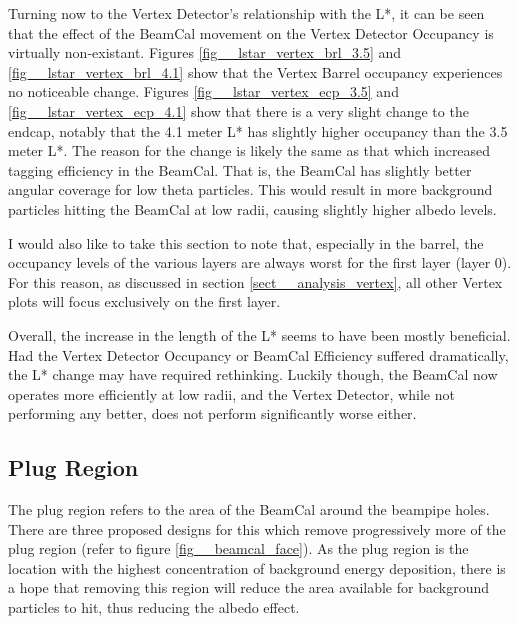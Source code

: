 \documentclass{report}
\begin{document}
                Turning now to the Vertex Detector's relationship with the L*, it can be seen that the effect of the BeamCal movement on the Vertex Detector Occupancy is virtually non-existant. Figures \ref{fig__lstar_vertex_brl_3.5} and \ref{fig__lstar_vertex_brl_4.1} show that the Vertex Barrel occupancy experiences no noticeable change. Figures \ref{fig__lstar_vertex_ecp_3.5} and \ref{fig__lstar_vertex_ecp_4.1} show that there is a very slight change to the endcap, notably that the 4.1 meter L* has slightly higher occupancy than the 3.5 meter L*. The reason for the change is likely the same as that which increased tagging efficiency in the BeamCal. That is, the BeamCal has slightly better angular coverage for low theta particles. This would result in more background particles hitting the BeamCal at low radii, causing slightly higher albedo levels.

                I would also like to take this section to note that, especially in the barrel, the occupancy levels of the various layers are always worst for the first layer (layer 0). For this reason, as discussed in section \ref{sect__analysis_vertex}, all other Vertex plots will focus exclusively on the first layer.

                Overall, the increase in the length of the L* seems to have been mostly beneficial. Had the Vertex Detector Occupancy or BeamCal Efficiency suffered dramatically, the L* change may have required rethinking. Luckily though, the BeamCal now operates more efficiently at low radii, and the Vertex Detector, while not performing any better, does not perform significantly worse either.


            \subsection{Plug Region}
                The plug region refers to the area of the BeamCal around the beampipe holes. There are three proposed designs for this which remove progressively more of the plug region (refer to figure \ref{fig__beamcal_face}). As the plug region is the location with the highest concentration of background energy deposition, there is a hope that removing this region will reduce the area available for background particles to hit, thus reducing the albedo effect.
\end{document}
